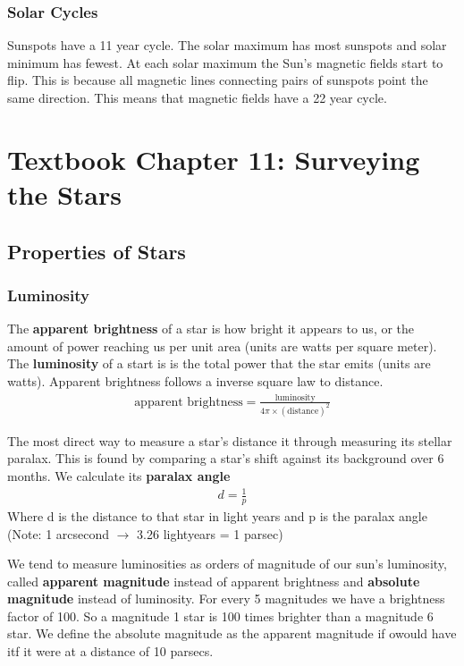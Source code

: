 \documentclass[12pt]{article}
\begin{document}
\subsubsection{Solar Cycles}
Sunspots have a 11 year cycle. The solar maximum has most sunspots and solar minimum has fewest. At each solar maximum the Sun's magnetic fields start to flip. This is because all magnetic lines connecting pairs of sunspots point the same direction. This means that magnetic fields have a 22 year cycle.

\section{Textbook Chapter 11: Surveying the Stars}
\subsection{Properties of Stars}
\subsubsection{Luminosity}
The \textbf{apparent brightness} of a star is how bright it appears to us, or the amount of power reaching us per unit area (units are watts per square meter). The \textbf{luminosity} of a start is is the total power that the star emits (units are watts). Apparent brightness follows a inverse square law to distance.
\begin{align*}
    \text{apparent brightness} = \frac{\text{luminosity}}{4\pi \times (\text{distance})^2}
\end{align*}

The most direct way to measure a star's distance it through measuring its stellar paralax. This is found by comparing a star's shift against its background over 6 months. We calculate its \textbf{paralax angle}
\begin{align*}
    d = \frac{1}{p}
\end{align*}
Where d is the distance to that star in light years and p is the paralax angle (Note: 1 arcsecond $\rightarrow$ 3.26 lightyears = 1 parsec)

We tend to measure luminosities as orders of magnitude of our sun's luminosity, called \textbf{apparent magnitude} instead of apparent brightness and \textbf{absolute magnitude} instead of luminosity. For every 5 magnitudes we have a brightness factor of 100. So a magnitude 1 star is 100 times brighter than a magnitude 6 star. We define the absolute magnitude as the apparent magnitude if owould have itf it were at a distance of 10 parsecs.
\end{document}

